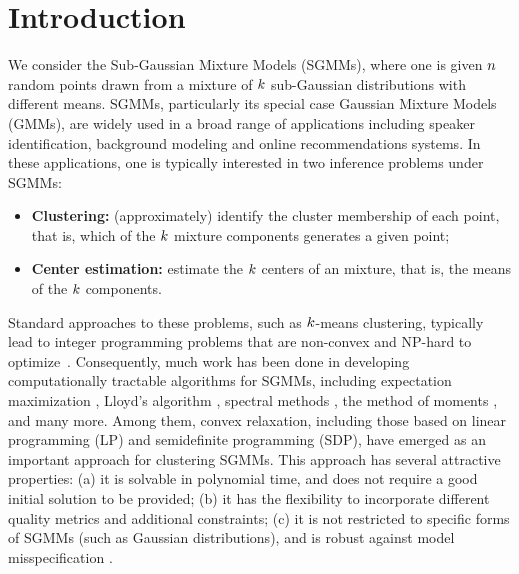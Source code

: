 
\section{Introduction\label{sec:intro}}

We consider the Sub-Gaussian Mixture Models (SGMMs), where one is
given $n$ random points drawn from a mixture of $k$ sub-Gaussian
distributions with different means. SGMMs, particularly its special
case Gaussian Mixture Models (GMMs), are widely used in a broad range
of applications including speaker identification, background modeling
and online recommendations systems. In these applications, one is
typically interested in two inference problems under SGMMs:
\begin{itemize}
\item \textbf{Clustering:} (approximately) identify the cluster membership
of each point, that is, which of the $k$ mixture components
generates a given point;
\item \textbf{Center estimation:} estimate the $k$ centers of an
mixture, that is, the means of the $k$ components.
\end{itemize}
Standard approaches to these problems, such as $k$-means
clustering, typically lead to integer programming problems that are
non-convex and NP-hard to optimize~\citep{aloise2009hard,jain2002facility,mahajan2009planar}.
Consequently, much work has been done in developing computationally
tractable algorithms for SGMMs, including expectation maximization
\citep{dempster1977em}, Lloyd's algorithm \citep{lloyd1982least},
spectral methods \citep{vempala2004spectral}, the method of moments
\citep{pearson1936method}, and many more. Among them, convex relaxation,
including those based on linear programming (LP) and semidefinite
programming (SDP), have emerged as an important approach for clustering
SGMMs. This approach has several attractive properties: (a) it is
solvable in polynomial time, and does not require a good initial solution
to be provided; (b) it has the flexibility to incorporate different
quality metrics and additional constraints; (c) it is not restricted
to specific forms of SGMMs (such as Gaussian distributions), and is
robust against model misspecification \citep{peng2005new,peng2007approximating,nellore2015recovery}.

